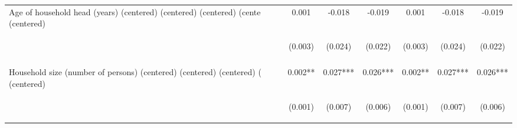 \begin{center}
\begin{tabular}{lcccccc}
Age of household head (years) (centered) (centered) (centered) (cente (centered) & 0.001 & -0.018 & -0.019 & 0.001 & -0.018 & -0.019 \\
 & \begin{footnotesize}(0.003)\end{footnotesize} & \begin{footnotesize}(0.024)\end{footnotesize} & \begin{footnotesize}(0.022)\end{footnotesize} & \begin{footnotesize}(0.003)\end{footnotesize} & \begin{footnotesize}(0.024)\end{footnotesize} & \begin{footnotesize}(0.022)\end{footnotesize} \\
\vspace{4pt} & \begin{footnotesize}[0.864]\end{footnotesize} & \begin{footnotesize}[0.450]\end{footnotesize} & \begin{footnotesize}[0.383]\end{footnotesize} & \begin{footnotesize}[0.864]\end{footnotesize} & \begin{footnotesize}[0.450]\end{footnotesize} & \begin{footnotesize}[0.383]\end{footnotesize} \\
Household size (number of persons) (centered) (centered) (centered) ( (centered) & 0.002** & 0.027*** & 0.026*** & 0.002** & 0.027*** & 0.026*** \\
 & \begin{footnotesize}(0.001)\end{footnotesize} & \begin{footnotesize}(0.007)\end{footnotesize} & \begin{footnotesize}(0.006)\end{footnotesize} & \begin{footnotesize}(0.001)\end{footnotesize} & \begin{footnotesize}(0.007)\end{footnotesize} & \begin{footnotesize}(0.006)\end{footnotesize} \\

\end{tabular}
\end{center}
